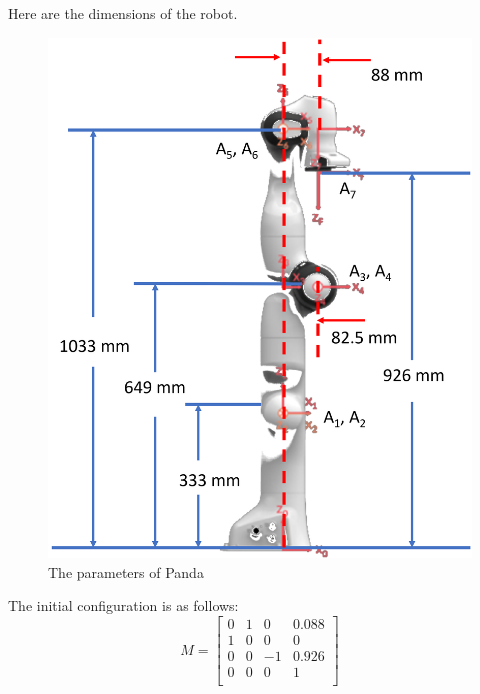 \documentclass[english,10pt,a4paper]{article}
\begin{document}
    Here are the dimensions of the robot.
    \begin{figure}[H]\label{dims}
        \includegraphics[scale=0.7]{dims.png}
        \caption{The parameters of Panda}
    \end{figure}
	
    The initial configuration is as follows:
    $$M = \begin{bmatrix}
        0 & 1 & 0 & 0.088\\
        1 & 0 & 0 & 0\\
        0 & 0 & -1 & 0.926 \\
        0 & 0 & 0 & 1 \\
    \end{bmatrix}$$
    
\end{document}
